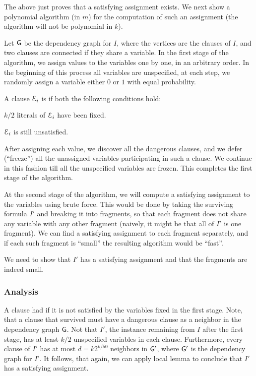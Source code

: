 The above just proves that a satisfying assignment exists. We next
show a polynomial algorithm (in $m$) for the computation of such an
assignment (the algorithm will not be polynomial in $k$).

Let $\mathsf{G}$ be the dependency graph for $I$, where the vertices are
the clauses of $I$, and two clauses are connected if they share a
variable.  In the first stage of the algorithm, we assign values to
the variables one by one, in an arbitrary order. In the beginning of
this process all variables are unspecified, at each step, we randomly
assign a variable either $0$ or $1$ with equal probability.

\begin{defn}
    A clause $\EuScript{E}_i$ is  if  both the
    following conditions hold:
    \begin{compactenumi}
        \item $k/2$ literals of $\EuScript{E}_i$ have been fixed.
        
        \item $\EuScript{E}_i$ is still unsatisfied. 
    \end{compactenumi}
\end{defn}

After assigning each value, we discover all the dangerous clauses, and
we defer (``freeze'') all the unassigned variables participating in
such a clause.  We continue in this fashion till all the unspecified
variables are frozen. This completes the first stage of the
algorithm. 

At the second stage of the algorithm, we will compute a satisfying
assignment to the variables using brute force. This would be done by
taking the surviving formula $I'$ and breaking it into fragments, so
that each fragment does not share any variable with any other fragment
(naively, it might be that all of $I'$ is one fragment). We can find a
satisfying assignment to each fragment separately, and if each such
fragment is ``small'' the resulting algorithm would be ``fast''.

We need to show that $I'$ has a satisfying assignment and that the
fragments are indeed small.


\subsubsection{Analysis}

A clause had  if it is not satisfied
by the variables fixed in the first stage.  Note, that a clause that
survived must have a dangerous clause as a neighbor in the dependency
graph $\mathsf{G}$.  Not that $I'$, the instance remaining from $I$ after
the first stage, has at least $k/2$ unspecified variables in each
clause. Furthermore, every clause of $I'$ has at most $d=k2^{k/50}$
neighbors in $\mathsf{G}'$, where $\mathsf{G}'$ is the dependency graph for $I'$. It
follows, that again, we can apply \Lovasz{} local lemma to conclude
that $I'$ has a satisfying assignment.

